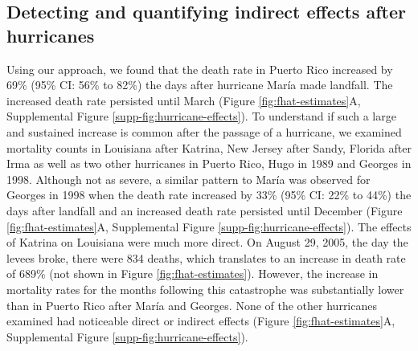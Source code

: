 \documentclass[11pt]{article}
\begin{document}
\subsection{Detecting and quantifying indirect effects after hurricanes}
\label{subsec:effects}
Using our approach, we found that the death rate in Puerto Rico increased by 69\% (95\% CI: 56\% to 82\%) the days after hurricane Mar\'ia made landfall. The increased death rate persisted until March (Figure \ref{fig:fhat-estimates}A, Supplemental Figure \ref{supp-fig:hurricane-effects}). To understand if such a large and sustained increase is common after the passage of a hurricane, we examined mortality counts in Louisiana after Katrina, New Jersey after Sandy, Florida after Irma as well as two other hurricanes in Puerto Rico, Hugo in 1989 and Georges in 1998.  Although not as severe, a similar pattern to Mar\'ia was observed for Georges in 1998 when the death rate increased by 33\% (95\% CI: 22\% to 44\%) the days after landfall and an increased death rate persisted until December (Figure \ref{fig:fhat-estimates}A, Supplemental Figure \ref{supp-fig:hurricane-effects}). The effects of Katrina on Louisiana were much more direct. On August 29, 2005, the day the levees broke, there were 834 deaths, which translates to an increase in death rate of 689\% (not shown in Figure \ref{fig:fhat-estimates}). However, the increase in mortality rates for the months following this catastrophe was substantially lower than in Puerto Rico after Mar\'ia and Georges. None of the other hurricanes examined had noticeable direct or indirect effects (Figure \ref{fig:fhat-estimates}A, Supplemental Figure \ref{supp-fig:hurricane-effects}).
\end{document}
